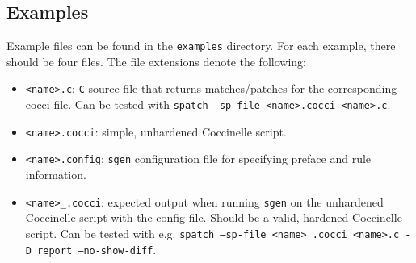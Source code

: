 \subsection{Examples}
Example files can be found in the \texttt{examples} directory. For each example, there should be four files. The file extensions denote the following:
\begin{itemize}
\item \texttt{<name>.c}: \texttt{C} source file that returns matches/patches for the corresponding cocci file. Can be tested with \texttt{spatch --sp-file <name>.cocci <name>.c}.
\item \texttt{<name>.cocci}: simple, unhardened Coccinelle script.
\item \texttt{<name>.config}: \texttt{sgen} configuration file for specifying preface and rule information.
\item \texttt{<name>\_.cocci}: expected output when running \texttt{sgen} on the unhardened Coccinelle script with the config file. Should be a valid, hardened Coccinelle script. Can be tested with e.g. \texttt{spatch --sp-file <name>\_.cocci <name>.c -D report --no-show-diff}.
\end{itemize}

